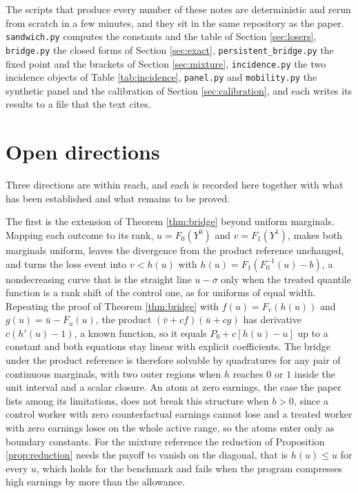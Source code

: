 \documentclass[11pt,a4paper]{article}
\theoremstyle{notesplain}
\theoremstyle{notesupright}
\numberwithin{equation}{section}
\begin{document}
The scripts that produce every number of these notes are deterministic and rerun from scratch in a few minutes, and they sit in the same repository as the paper. \texttt{sandwich.py} computes the constants and the table of Section \ref{sec:losers}, \texttt{bridge.py} the closed forms of Section \ref{sec:exact}, \texttt{persistent\_bridge.py} the fixed point and the brackets of Section \ref{sec:mixture}, \texttt{incidence.py} the two incidence objects of Table \ref{tab:incidence}, \texttt{panel.py} and \texttt{mobility.py} the synthetic panel and the calibration of Section \ref{sec:calibration}, and each writes its results to a file that the text cites.

\section{Open directions}
\label{sec:open}
Three directions are within reach, and each is recorded here together with what has been established and what remains to be proved.

The first is the extension of Theorem \ref{thm:bridge} beyond uniform marginals. Mapping each outcome to its rank, $u=F_0(Y^0)$ and $v=F_1(Y^1)$, makes both marginals uniform, leaves the divergence from the product reference unchanged, and turns the loss event into $v<h(u)$ with $h(u)=F_1(F_0^{-1}(u)-b)$, a nondecreasing curve that is the straight line $u-\sigma$ only when the treated quantile function is a rank shift of the control one, as for uniforms of equal width. Repeating the proof of Theorem \ref{thm:bridge} with $f(u)=F_v(h(u))$ and $g(u)=\bar u-F_u(u)$, the product $(\bar v+cf)(\bar u+cg)$ has derivative $c(h'(u)-1)$, a known function, so it equals $P_0+c[h(u)-u]$ up to a constant and both equations stay linear with explicit coefficients. The bridge under the product reference is therefore solvable by quadratures for any pair of continuous marginals, with two outer regions when $h$ reaches $0$ or $1$ inside the unit interval and a scalar closure. An atom at zero earnings, the case the paper lists among its limitations, does not break this structure when $b>0$, since a control worker with zero counterfactual earnings cannot lose and a treated worker with zero earnings loses on the whole active range, so the atoms enter only as boundary constants. For the mixture reference the reduction of Proposition \ref{prop:reduction} needs the payoff to vanish on the diagonal, that is $h(u)\le u$ for every $u$, which holds for the benchmark and fails when the program compresses high earnings by more than the allowance.
\end{document}
